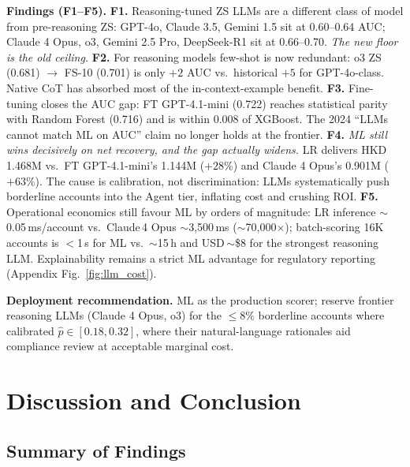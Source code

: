 \documentclass[11pt, a4paper]{article}
\begin{document}
\textbf{Findings (F1--F5).}
\textbf{F1.} Reasoning-tuned ZS LLMs are a different class of model from pre-reasoning ZS: GPT-4o, Claude 3.5, Gemini 1.5 sit at 0.60--0.64 AUC; Claude 4 Opus, o3, Gemini 2.5 Pro, DeepSeek-R1 sit at 0.66--0.70. \emph{The new floor is the old ceiling.}
\textbf{F2.} For reasoning models few-shot is now redundant: o3 ZS (0.681) $\to$ FS-10 (0.701) is only $+2$ AUC vs.\ historical $+5$ for GPT-4o-class. Native CoT has absorbed most of the in-context-example benefit.
\textbf{F3.} Fine-tuning closes the AUC gap: FT GPT-4.1-mini (0.722) reaches statistical parity with Random Forest (0.716) and is within $0.008$ of XGBoost. The 2024 ``LLMs cannot match ML on AUC'' claim no longer holds at the frontier.
\textbf{F4.} \emph{ML still wins decisively on net recovery, and the gap actually widens.} LR delivers HKD\,1.468M vs.\ FT GPT-4.1-mini's 1.144M ($+28\%$) and Claude 4 Opus's 0.901M ($+63\%$). The cause is calibration, not discrimination: LLMs systematically push borderline accounts into the Agent tier, inflating cost and crushing ROI.
\textbf{F5.} Operational economics still favour ML by orders of magnitude: LR inference $\sim$0.05\,ms/account vs.\ Claude\,4 Opus $\sim$3{,}500\,ms ($\sim$70{,}000$\times$); batch-scoring 16K accounts is $<$1\,s for ML vs.\ $\sim$15\,h and USD\,$\sim$\$8 for the strongest reasoning LLM. Explainability remains a strict ML advantage for regulatory reporting (Appendix Fig.~\ref{fig:llm_cost}).

\textbf{Deployment recommendation.} ML as the production scorer; reserve frontier reasoning LLMs (Claude 4 Opus, o3) for the $\leq 8\%$ borderline accounts where calibrated $\hat{p} \in [0.18, 0.32]$, where their natural-language rationales aid compliance review at acceptable marginal cost.


\section{Discussion and Conclusion}\label{sec:discussion}

\subsection{Summary of Findings}
\end{document}
